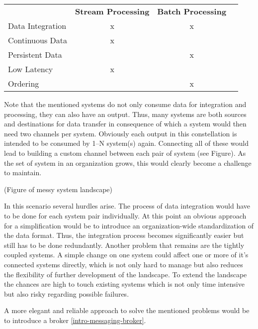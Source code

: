 \begin{table}[h]
\begin{tabular}{l|c|cl}
\multicolumn{1}{c|}{\textbf{}} & \textbf{Stream Processing} & \textbf{Batch
Processing} & \multicolumn{1}{c}{\textbf{}} \\ \cline{1-3}
Data Integration               & x                          & x
&                               \\
Continuous Data                & x                          &
&                               \\
Persistent Data                &                            & x
&                               \\
Low Latency                    & x                          &
&                               \\
Ordering                       &                            & x
&
\end{tabular}
\end{table}

Note that the mentioned systems do not only consume data for integration and
processing, they can also have an output. Thus, many systems are both sources and
destinations for data transfer in consequence of which a system would then need
two channels  per system. 
Obviously each output in this constellation is intended to be consumed by 1--N
system(s) again. Connecting all of these would lead to building a custom
channel between each pair of system (see Figure). As the set of system in an organization
grows, this would clearly become a challenge to maintain.

(Figure of messy system landscape)

In this scenario several hurdles arise. The process of data integration would
have to be done for each system pair individually. At this point an obvious
approach for a simplification would be to introduce an organization-wide
standardization of the data format. Thus, the integration process becomes 
significantly easier but still has to be done redundantly. Another problem that
remains are the tightly coupled systems. A simple change on one system could
affect one or more of it's connected systems directly, which is not only hard to
manage but also reduces the flexibility of further development of the landscape.
To extend the landscape the chances are high to touch existing systems which is
not only time intensive but also risky regarding possible failures.

A more elegant and reliable approach to solve the mentioned problems would be to
introduce a broker \ref{intro-messaging-broker}.

